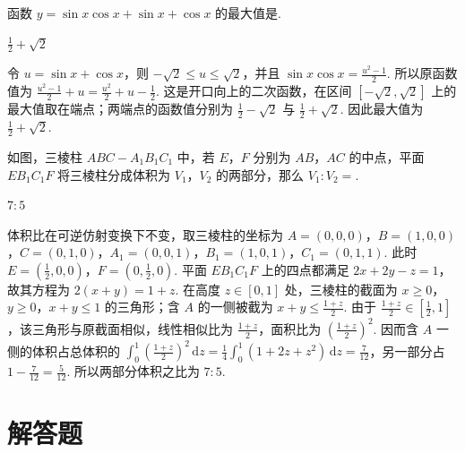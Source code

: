 \begin{problem}
函数 \(y=\sin x\cos x+\sin x+\cos x\) 的最大值是\fillinblank{}.
\end{problem}

\begin{answer}
\(\frac{1}{2}+\sqrt{2}\)
\end{answer}

\begin{solution}
令 \(u=\sin x+\cos x\)，则 \(-\sqrt{2}\leqslant u\leqslant\sqrt{2}\)，并且 \(\sin x\cos x=\frac{u^2-1}{2}\). 所以原函数值为 \(\frac{u^2-1}{2}+u=\frac{u^2}{2}+u-\frac{1}{2}\). 这是开口向上的二次函数，在区间 \([-\sqrt{2},\sqrt{2}]\) 上的最大值取在端点；两端点的函数值分别为 \(\frac{1}{2}-\sqrt{2}\) 与 \(\frac{1}{2}+\sqrt{2}\). 因此最大值为 \(\frac{1}{2}+\sqrt{2}\).
\end{solution}

\begin{problem}
如图，三棱柱 \(ABC-A_1B_1C_1\) 中，若 \(E\)，\(F\) 分别为 \(AB\)，\(AC\) 的中点，平面 \(EB_1C_1F\) 将三棱柱分成体积为 \(V_1\)，\(V_2\) 的两部分，那么 \(V_1:V_2=\)\fillinblank{}.

\end{problem}

\begin{answer}
\(7:5\)
\end{answer}

\begin{solution}
体积比在可逆仿射变换下不变，取三棱柱的坐标为 \(A=(0,0,0)\)，\(B=(1,0,0)\)，\(C=(0,1,0)\)，\(A_1=(0,0,1)\)，\(B_1=(1,0,1)\)，\(C_1=(0,1,1)\). 此时 \(E=(\frac{1}{2},0,0)\)，\(F=(0,\frac{1}{2},0)\). 平面 \(EB_1C_1F\) 上的四点都满足 \(2x+2y-z=1\)，故其方程为 \(2(x+y)=1+z\). 在高度 \(z\in[0,1]\) 处，三棱柱的截面为 \(x\geqslant0\)，\(y\geqslant0\)，\(x+y\leqslant1\) 的三角形；含 \(A\) 的一侧被截为 \(x+y\leqslant\frac{1+z}{2}\). 由于 \(\frac{1+z}{2}\in[\frac12,1]\)，该三角形与原截面相似，线性相似比为 \(\frac{1+z}{2}\)，面积比为 \(\left(\frac{1+z}{2}\right)^2\). 因而含 \(A\) 一侧的体积占总体积的 \(\int_0^1\left(\frac{1+z}{2}\right)^2\,\mathrm dz=\frac{1}{4}\int_0^1(1+2z+z^2)\,\mathrm dz=\frac{7}{12}\)，另一部分占 \(1-\frac{7}{12}=\frac{5}{12}\). 所以两部分体积之比为 \(7:5\).
\end{solution}

\section{解答题}

